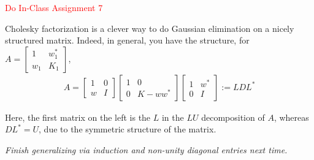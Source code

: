 \documentclass{ximera}
\begin{document}
\textcolor{red}{Do In-Class Assignment 7}

Cholesky factorization is a clever way to do Gaussian elimination on a nicely structured matrix.  Indeed, in general, you have the structure, for $A = \begin{bmatrix}1 & w_1^* \\ w_1 & K_1\end{bmatrix}$,
\begin{align*}
    A = \begin{bmatrix}
        1 & 0 \\ w & I
    \end{bmatrix}
    \begin{bmatrix}
        1 & 0 \\ 0 & K-ww^*
    \end{bmatrix}
    \begin{bmatrix}
        1 & w^* \\
        0 & I
    \end{bmatrix}
    := LDL^*
\end{align*}

Here, the first matrix on the left is the $L$ in the $LU$ decomposition of $A$, whereas $DL^* = U$, due to the symmetric structure of the matrix.

\textit{Finish generalizing via induction and non-unity diagonal entries next time.}


\end{document}
